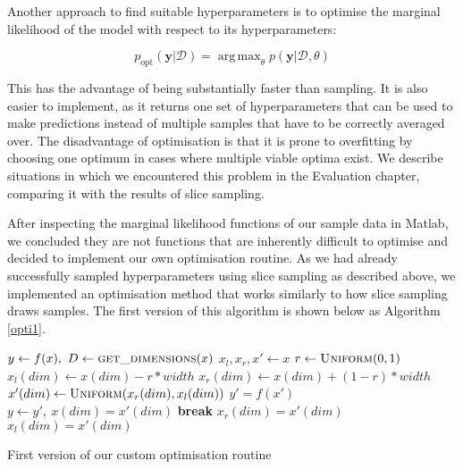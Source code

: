 \documentclass[a4paper,12pt,twoside,openright]{report}
\newcommand{\Break}{\State \textbf{break} }
\DeclareMathOperator*{\argmax}{arg\,max}
\begin{document}
Another approach to find suitable hyperparameters is to optimise the marginal likelihood of the model with respect to its hyperparameters:

\begin{equation}
p_{\text{opt}}(\mathbf{y}|\mathcal{D}) = \argmax_\theta p(\mathbf{y}|\mathcal{D}, \theta)
\end{equation}


This has the advantage of being substantially faster than sampling. It is also easier to implement, as it returns one set of hyperparameters that can be used to make predictions instead of multiple samples that have to be correctly averaged over. The disadvantage of optimisation is that it is prone to overfitting by choosing one optimum in cases where multiple viable optima exist. We describe situations in which we encountered this problem in the Evaluation chapter, comparing it with the results of slice sampling.

After inspecting the marginal likelihood functions of our sample data in Matlab, we concluded they are not functions that are inherently difficult to optimise and decided to implement our own optimisation routine. As we had already successfully sampled hyperparameters using slice sampling as described above, we implemented an optimisation method that works similarly to how slice sampling draws samples. The first version of this algorithm is shown below as Algorithm \ref{opti1}.


\begin{algorithm}
\begin{algorithmic}[1]
\State $y\gets f(x),\ D\gets \Call{get\_dimensions}{x}$
\State $x_l, x_r, x'\gets x$
\State $r\gets \Call{Uniform}{0, 1}$
\State $x_l(dim)\gets x(dim) - r * width$
\State $x_r(dim)\gets x(dim) + (1 - r) * width$
\State $x'(dim)\gets \Call{Uniform}{x_r(dim), x_l(dim)}$
\State $y' = f(x')$
\State $y\gets y',\ x(dim) = x'(dim)$
\Break
\EndIf
{}
\State $x_r(dim) = x'(dim)$
\State $x_l(dim) = x'(dim)$
\EndIf
\EndFor
\EndFor
\EndFor
\EndProcedure
\end{algorithmic}
\caption{First version of our custom optimisation routine}
\label{opti1}
\end{algorithm}
\end{document}
